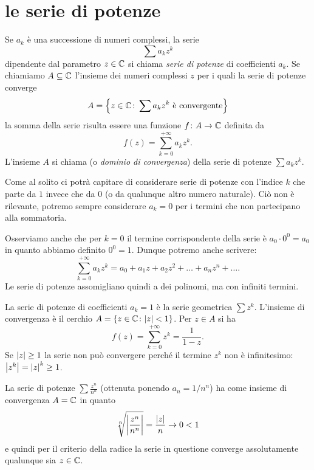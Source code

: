 \section{le serie di potenze}

Se $a_k$ è una successione di numeri complessi, la serie
\[
 \sum a_k z^k
\]
dipendente dal parametro $z\in {\mathbb C}$ si chiama
\emph{serie di potenze}%
%
di coefficienti $a_k$.
Se chiamiamo $A\subseteq {\mathbb C}$ l'insieme dei numeri complessi $z$
per i quali la serie di potenze converge
\[
A= {\left\{ z\in {\mathbb C} \colon \sum a_k z^k \text{ è convergente} \right\}}
\]
la somma della serie risulta essere una funzione
$f \colon A \to {\mathbb C}$ definita da
\[
  f(z) = \sum_{k=0}^{+\infty} a_k z^k.
\]
L'insieme $A$ si chiama 
(o \emph{dominio di convergenza}) della serie
di potenze $\sum a_k z^k$.

Come al solito ci potrà capitare di considerare serie
di potenze con l'indice $k$ che parte da $1$ invece che da $0$
(o da qualunque altro numero naturale).
Ciò non è rilevante, potremo sempre considerare $a_k=0$ per i termini
che non partecipano alla sommatoria.

Osserviamo anche che per $k=0$ il termine corrispondente della serie è
$a_0 \cdot 0^0 = a_0$ in
quanto abbiamo definito $0^0=1$. Dunque potremo anche scrivere:
\[
  \sum_{k=0}^{+\infty} a_k z^k = a_0 + a_1 z + a_2 z^2 + \dots + a_n z^n + \dots.
\]
Le serie di potenze assomigliano quindi a dei polinomi, ma con infiniti termini.

\begin{example}
La serie di potenze di coefficienti $a_k=1$ è la
serie geometrica $\sum z^k$.
L'insieme di convergenza è il cerchio
$A={\left\{ z\in {\mathbb C} \colon {\left|z\right|}<1 \right\}}$.
Per $z\in A$ si ha
\[
 f(z) = \sum_{k=0}^{+\infty} z^k  = \frac{1}{1-z}.
\]
Se ${\left|z\right|}\ge 1$ la serie non può convergere perché il termine $z^k$ non è
infinitesimo: ${\left|z^k\right|} = {\left|z\right|}^k \ge 1$.
\end{example}

\begin{example}
\label{ex:477474}
La serie di potenze $\sum \frac{z^n}{n^n}$ (ottenuta ponendo $a_n=1/n^n$)
ha come insieme di convergenza $A={\mathbb C}$
in quanto
\[
\sqrt[n]{{\left|\frac{z^n}{n^n}\right|}} = \frac{{\left|z\right|}}{n} \to 0 < 1
\]
e quindi per il criterio della radice la serie in questione converge assolutamente
qualunque sia $z\in {\mathbb C}$.
\end{example}

